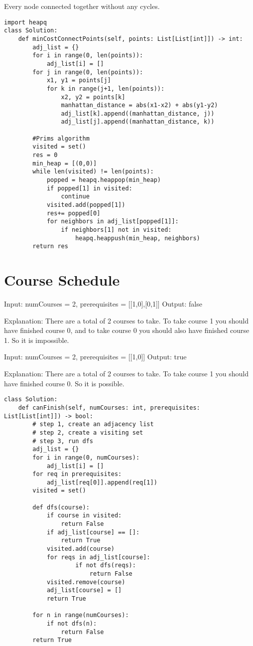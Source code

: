 \documentclass[24pt, a4]{article}
\begin{document}
Every node connected together without any cycles.
\begin{lstlisting}
import heapq
class Solution:
    def minCostConnectPoints(self, points: List[List[int]]) -> int:
        adj_list = {}
        for i in range(0, len(points)):
            adj_list[i] = []
        for j in range(0, len(points)):
            x1, y1 = points[j]
            for k in range(j+1, len(points)):
                x2, y2 = points[k]
                manhattan_distance = abs(x1-x2) + abs(y1-y2)
                adj_list[k].append((manhattan_distance, j))
                adj_list[j].append((manhattan_distance, k))
        
        #Prims algorithm
        visited = set()
        res = 0
        min_heap = [(0,0)]
        while len(visited) != len(points):
            popped = heapq.heappop(min_heap)
            if popped[1] in visited:
                continue
            visited.add(popped[1])
            res+= popped[0]
            for neighbors in adj_list[popped[1]]:
                if neighbors[1] not in visited:
                    heapq.heappush(min_heap, neighbors)
        return res
\end{lstlisting}

\newpage
\section{Course Schedule}
Input: numCourses = 2, prerequisites = [[1,0],[0,1]]
Output: false

Explanation: There are a total of 2 courses to take.
To take course 1 you should have finished course 0, and to take course 0 
you should also have finished course 1. So it is impossible.

Input: numCourses = 2, prerequisites = [[1,0]]
Output: true

Explanation: There are a total of 2 courses to take. 
To take course 1 you should have finished course 0. So it is possible.
\begin{lstlisting}
class Solution:
    def canFinish(self, numCourses: int, prerequisites: List[List[int]]) -> bool:
        # step 1, create an adjacency list
        # step 2, create a visiting set
        # step 3, run dfs
        adj_list = {}
        for i in range(0, numCourses):
            adj_list[i] = []
        for req in prerequisites:
            adj_list[req[0]].append(req[1])
        visited = set()

        def dfs(course):
            if course in visited:
                return False
            if adj_list[course] == []:
                return True
            visited.add(course)
            for reqs in adj_list[course]:
                    if not dfs(reqs):
                        return False
            visited.remove(course)
            adj_list[course] = []
            return True

        for n in range(numCourses):
            if not dfs(n):
                return False
        return True
\end{lstlisting}
\newpage
\end{document}
